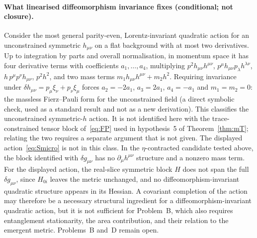 \paragraph{What linearised diffeomorphism invariance fixes (conditional; not closure).}
Consider the most general parity-even, Lorentz-invariant quadratic action for
an unconstrained symmetric \(h_{\mu\nu}\) on a flat background with at most
two derivatives. Up to integration by parts and overall normalisation, in
momentum space it has four derivative terms with coefficients
\(a_1,\dots,a_4\), multiplying \(p^2h_{\mu\nu}h^{\mu\nu}\),
\(p^\mu h_{\mu\nu}p_\lambda h^{\lambda\nu}\), \(h\,p^\mu p^\nu h_{\mu\nu}\),
\(p^2h^2\), and two mass terms \(m_1h_{\mu\nu}h^{\mu\nu}+m_2h^2\). Requiring
invariance under \(\delta h_{\mu\nu}=p_\mu\xi_\nu+p_\nu\xi_\mu\) forces
\(a_2=-2a_1\), \(a_3=2a_1\), \(a_4=-a_1\) and \(m_1=m_2=0\): the massless
Fierz--Pauli form for the unconstrained field (a direct symbolic check, used
as a standard result and not as a new derivation). This classifies the
unconstrained symmetric-\(h\) action. It is not identified here with the
trace-constrained tensor block of~\eqref{eq:FP} used in hypothesis~5 of
Theorem~\ref{thm:mT}; relating the two requires a separate argument that is
not given. The displayed action~\eqref{eq:Smicro} is not in this class. In the
\(\eta\)-contracted candidate tested above, the block identified with
\(\delta g_{\mu\nu}\) has no \(\partial_\mu h^{\mu\nu}\) structure and a
nonzero mass term. For the displayed action, the real-slice symmetric block
\(H\) does not span the full \(\delta g_{\mu\nu}\), since \(H_{0i}\) leaves
the metric unchanged, and no diffeomorphism-invariant quadratic structure
appears in its Hessian. A covariant
completion of the action may therefore be a necessary structural ingredient
for a diffeomorphism-invariant quadratic action, but it is not sufficient for
Problem~B, which also requires entanglement stationarity, the area
contribution, and their relation to the emergent metric. Problems~B and~D
remain open.

